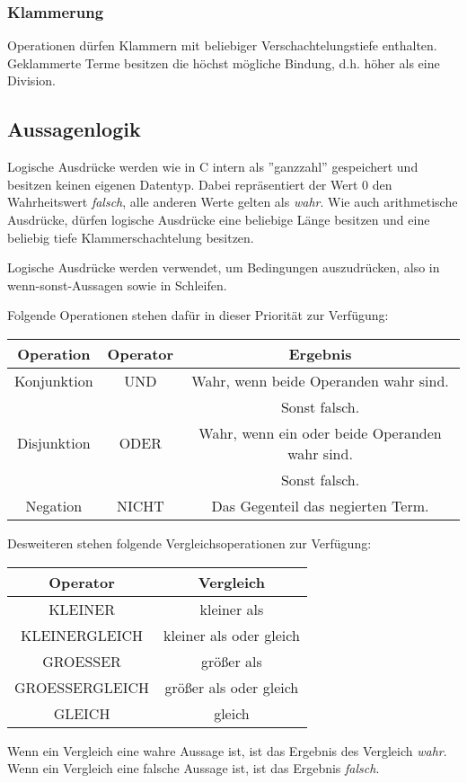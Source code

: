 \documentclass[12pt, a4paper, oneside, ngerman]{article}
\begin{document}
\subsubsection{Klammerung}
Operationen dürfen Klammern mit beliebiger Verschachtelungstiefe enthalten.
Geklammerte Terme besitzen die höchst mögliche Bindung, d.h. höher als eine Division.

\subsection{Aussagenlogik}
Logische Ausdrücke werden wie in C intern als ''ganzzahl'' gespeichert und besitzen keinen eigenen Datentyp. Dabei repräsentiert der Wert 0 den Wahrheitswert \textit{falsch}, alle anderen Werte gelten als \textit{wahr}. Wie auch arithmetische Ausdrücke, dürfen logische Ausdrücke eine beliebige Länge besitzen und eine beliebig tiefe Klammerschachtelung besitzen.

Logische Ausdrücke werden verwendet, um Bedingungen auszudrücken, also in wenn-sonst-Aussagen sowie in Schleifen.

Folgende Operationen stehen dafür in dieser Priorität zur Verfügung:
\begin{center}
  \begin{tabular}{ | c | c | c | }
    \hline
    Operation   & Operator  & Ergebnis\\ \hline \hline
    Konjunktion & UND       & Wahr, wenn beide Operanden wahr sind.  \\
                &           & Sonst falsch.\\ \hline
    Disjunktion & ODER      & Wahr, wenn ein oder beide Operanden wahr sind. \\ 
	              &           & Sonst falsch.\\ \hline
    Negation    & NICHT     & Das Gegenteil das negierten Term.\\ \hline   
  \end{tabular}
\end{center}

Desweiteren stehen folgende Vergleichsoperationen zur Verfügung:
\begin{center}
  \begin{tabular}{ | c | c | }
    \hline
    Operator          & Vergleich               \\ \hline \hline
    KLEINER           & kleiner als             \\ \hline
    KLEINERGLEICH     & kleiner als oder gleich \\ \hline
    GROESSER          & größer als              \\ \hline
    GROESSERGLEICH    & größer als oder gleich  \\ \hline    
    GLEICH            & gleich                  \\ \hline    
  \end{tabular}
\end{center}
Wenn ein Vergleich eine wahre Aussage ist, ist das Ergebnis des Vergleich \textit{wahr}.
Wenn ein Vergleich eine falsche Aussage ist, ist das Ergebnis \textit{falsch}.
\end{document}
